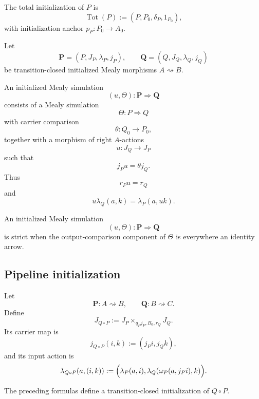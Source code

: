 \begin{definition}
\label{def:total-initialization}
The total initialization of \(P\) is
\[
  \operatorname{Tot}(P)
  :=
  (P,P_0,\delta_P,1_{P_0}),
\]
with initialization anchor \(p_P:P_0\to A_0\).
\end{definition}

\begin{definition}
\label{def:initialized-mealy-simulation}
Let
\[
  \mathbf P=(P,J_P,\lambda_P,j_P),
  \qquad
  \mathbf Q=(Q,J_Q,\lambda_Q,j_Q)
\]
be transition-closed initialized Mealy morphisms \(A\rightsquigarrow B\).

An initialized Mealy simulation
\[
  (u,\Theta):\mathbf P\Longrightarrow\mathbf Q
\]
consists of a Mealy simulation
\[
  \Theta:P\Longrightarrow Q
\]
with carrier comparison
\[
  \theta:Q_0\to P_0,
\]
together with a morphism of right \(A\)-actions
\[
  u:J_Q\longrightarrow J_P
\]
such that
\[
  j_Pu=\theta j_Q.
\]
Thus
\[
  r_Pu=r_Q
\]
and
\[
  u\lambda_Q(a,k)
  =
  \lambda_P(a,uk).
\]
\end{definition}

\begin{definition}
\label{def:strict-initialized-simulation}
An initialized Mealy simulation
\[
  (u,\Theta):\mathbf P\Longrightarrow\mathbf Q
\]
is strict when the output-comparison component of \(\Theta\) is everywhere an identity arrow.
\end{definition}

\subsection{Pipeline initialization}

Let
\[
  \mathbf P:A\rightsquigarrow B,
  \qquad
  \mathbf Q:B\rightsquigarrow C.
\]
Define
\[
  J_{Q\circ P}
  :=
  J_P\times_{q_Pj_P,B_0,r_Q}J_Q.
\]
Its carrier map is
\[
  j_{Q\circ P}(i,k)
  :=
  (j_Pi,j_Qk),
\]
and its input action is
\[
  \lambda_{Q\circ P}(a,(i,k))
  :=
  \Bigl(
    \lambda_P(a,i),
    \lambda_Q(\omega_P(a,j_Pi),k)
  \Bigr).
\]

\begin{lemma}
\label{lem:pipeline-initialization}
The preceding formulas define a transition-closed initialization of \(Q\circ P\).
\end{lemma}

